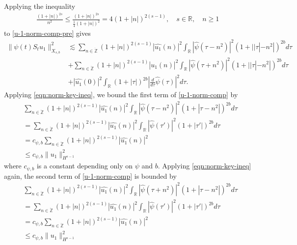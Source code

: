 \documentclass[12pt,reqno]{amsart}
\numberwithin{equation}{section}  %
\numberwithin{figure}{section}
\newcommand{\rr}{\mathbb{R}}
\newcommand{\zz}{\mathbb{Z}}
\newcommand{\wh}{\widehat}
\theoremstyle{plain}
\theoremstyle{definition}
\theoremstyle{remark}
\begin{document}
%
%
Applying the inequality
%
%
\begin{equation*}
\begin{split}
  \frac{(1 + |n|)^{2s}}{ n^{2}} \le \frac{(1 + |n|)^{2s}}{\frac{1}{4}(1 +
  |n|)^{2}} = 4 (1 + | n |)^{2(s-1)},  \quad s \in \rr, \quad n \ge 1
\end{split}
\end{equation*}
%
to \eqref{u-1-norm-comp-pre} gives
%
\begin{equation}
  \begin{split}
    \| \psi(t) S_{t}u_{1} \|_{X_{s,b}}^{2} 
    & \lesssim \sum_{n \in \dot{\zz}} \left( 1 + |n| \right)^{2(s-1)} | \wh{u_{1}}(n)
    |^{2} \int_{\rr} | \wh{\psi}(\tau - n^{2}) |^{2}\left( 1 + | | \tau | -
    n^{2} | \right)^{2b} d \tau
    \\
    & + \sum_{n \in \dot{\zz}} \left( 1 + |n| \right)^{2(s-1)} | \wh{u_{1}}(n)
    |^{2} \int_{\rr} | \wh{\psi}(\tau + n^{2}) |^{2}\left( 1 + | | \tau | -
    n^{2} | \right)^{2b} d \tau
    \\
    & + |\wh{u_{1}}(0)|^{2} \int_{\rr} (1 + | \tau |)^{2b} |\frac{d }{d \tau}
    \wh{\psi}(\tau)|^2 d \tau.
\end{split}
\label{u-1-norm-comp}
\end{equation}
%
%
Applying \eqref{eqn:norm-key-ineq},
we bound the first term of
\eqref{u-1-norm-comp} by
%
%
%
\begin{equation*}
  \begin{split}
    & \sum_{n \in \dot{\zz}} \left( 1 + |n| \right)^{2(s-1)} | \wh{u_{1}}(n)
    |^{2} \int_{\rr} | \wh{\psi}(\tau - n^{2}) |^{2}\left( 1 +  | \tau  -
    n^{2} | \right)^{2b} d \tau
    \\
    & = \sum_{n \in \dot{\zz}} \left( 1 + |n| \right)^{2(s-1)} | \wh{u_{1}}(n)
    |^{2} \int_{\rr} | \wh{\psi}(\tau') |^{2}\left( 1 +  | \tau'| \right)^{2b} d \tau
    \\
    & = c_{\psi, b} \sum_{n \in \dot{\zz}} \left( 1 + |n| \right)^{2(s-1)} | \wh{u_{1}}(n)
    |^{2} 
    \\
    & \le c_{\psi, b} \| u_{1} \|_{H^{s-1}}^{2}
  \end{split}
\end{equation*}
%
%
where $c_{\psi, b}$ is a constant depending only on $\psi$ and $b$. Applying
\eqref{eqn:norm-key-ineq} again, the
second term of \eqref{u-1-norm-comp} is bounded by
\begin{equation*}
  \begin{split}
    & \sum_{n \in \dot{\zz}} \left( 1 + |n| \right)^{2(s-1)} | \wh{u_{1}}(n)
    |^{2} \int_{\rr} | \wh{\psi}(\tau + n^{2}) |^{2}\left( 1 +  | \tau  -
    n^{2} | \right)^{2b} d \tau
    \\
    & = \sum_{n \in \dot{\zz}} \left( 1 + |n| \right)^{2(s-1)} | \wh{u_{1}}(n)
    |^{2} \int_{\rr} | \wh{\psi}(\tau') |^{2}\left( 1 +  | \tau'| \right)^{2b} d \tau
    \\
    & = c_{\psi, b} \sum_{n \in \dot{\zz}} \left( 1 + |n| \right)^{2(s-1)} | \wh{u_{1}}(n)
    |^{2} 
    \\
    & \le c_{\psi, b} \| u_{1} \|_{H^{s-1}}^{2}
  \end{split}
\end{equation*}
\end{document}
